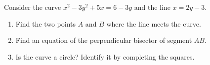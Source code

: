 Consider the curve $x^2-3y^2+5x=6-3y$ and the line $x=2y-3$.
\begin{enumerate}
\item[(a)] Find the two points $A$ and $B$ where the line meets the curve.
\item[(b)] Find an equation of the perpendicular bisector of segment $AB$.
\item[(c)] Is the curve a circle? Identify it by completing the squares.
\end{enumerate}
